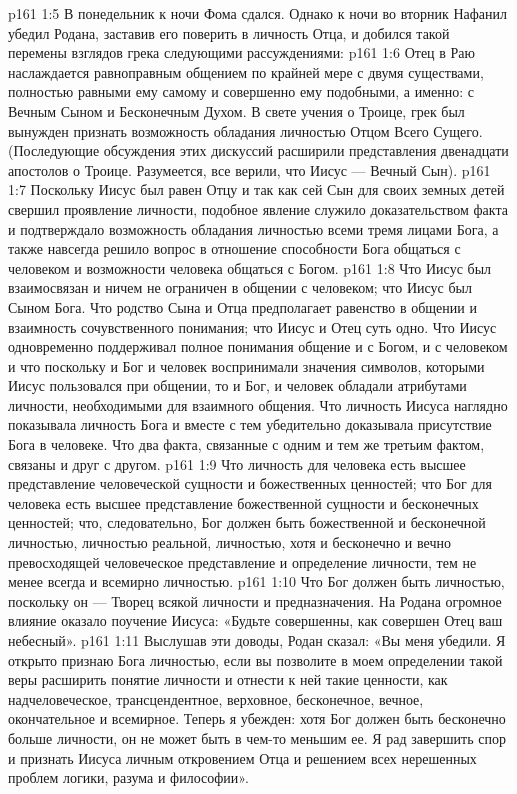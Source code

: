\vs p161 1:5 В понедельник к ночи Фома сдался. Однако к ночи во вторник Нафанил убедил Родана, заставив его поверить в личность Отца, и добился такой перемены взглядов грека следующими рассуждениями:
\vs p161 1:6 \bibnobreakspace Отец в Раю наслаждается равноправным общением по крайней мере с двумя существами, полностью равными ему самому и совершенно ему подобными, а именно: с Вечным Сыном и Бесконечным Духом. В свете учения о Троице, грек был вынужден признать возможность обладания личностью Отцом Всего Сущего. (Последующие обсуждения этих дискуссий расширили представления двенадцати апостолов о Троице. Разумеется, все верили, что Иисус --- Вечный Сын).
\vs p161 1:7 \pc {}\bibnobreakspace Поскольку Иисус был равен Отцу и так как сей Сын для своих земных детей свершил проявление личности, подобное явление служило доказательством факта и подтверждало возможность обладания личностью всеми тремя лицами Бога, а также навсегда решило вопрос в отношение способности Бога общаться с человеком и возможности человека общаться с Богом.
\vs p161 1:8 \pc {}\bibnobreakspace Что Иисус был взаимосвязан и ничем не ограничен в общении с человеком; что Иисус был Сыном Бога. Что родство Сына и Отца предполагает равенство в общении и взаимность сочувственного понимания; что Иисус и Отец суть одно. Что Иисус одновременно поддерживал полное понимания общение и с Богом, и с человеком и что поскольку и Бог и человек воспринимали значения символов, которыми Иисус пользовался при общении, то и Бог, и человек обладали атрибутами личности, необходимыми для взаимного общения. Что личность Иисуса наглядно показывала личность Бога и вместе с тем убедительно доказывала присутствие Бога в человеке. Что два факта, связанные с одним и тем же третьим фактом, связаны и друг с другом.
\vs p161 1:9 \pc {}\bibnobreakspace Что личность для человека есть высшее представление человеческой сущности и божественных ценностей; что Бог для человека есть высшее представление божественной сущности и бесконечных ценностей; что, следовательно, Бог должен быть божественной и бесконечной личностью, личностью реальной, личностью, хотя и бесконечно и вечно превосходящей человеческое представление и определение личности, тем не менее всегда и всемирно личностью.
\vs p161 1:10 \pc {}\bibnobreakspace Что Бог должен быть личностью, поскольку он --- Творец всякой личности и предназначения. На Родана огромное влияние оказало поучение Иисуса: «Будьте совершенны, как совершен Отец ваш небесный».
\vs p161 1:11 \pc Выслушав эти доводы, Родан сказал: «Вы меня убедили. Я открыто признаю Бога личностью, если вы позволите в моем определении такой веры расширить понятие личности и отнести к ней такие ценности, как надчеловеческое, трансцендентное, верховное, бесконечное, вечное, окончательное и всемирное. Теперь я убежден: хотя Бог должен быть бесконечно больше личности, он не может быть в чем\hyp{}то меньшим ее. Я рад завершить спор и признать Иисуса личным откровением Отца и решением всех нерешенных проблем логики, разума и философии».
